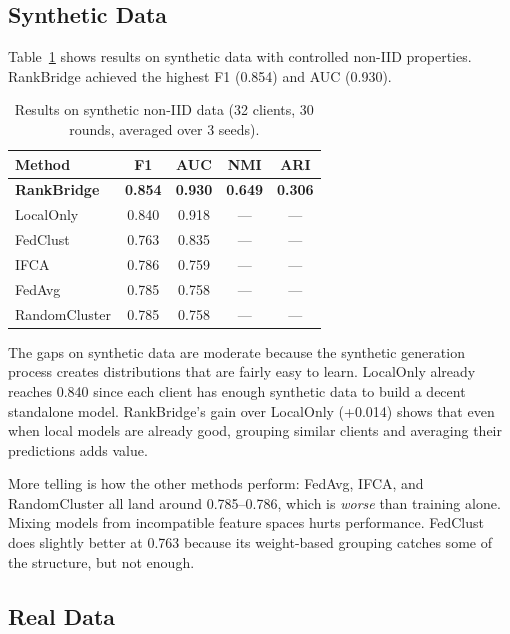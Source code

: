 \documentclass[12pt,a4paper]{article}
\begin{document}
\subsection{Synthetic Data}

Table~\ref{tab:synthetic_results} shows results on synthetic data with controlled non-IID properties. RankBridge achieved the highest F1 (0.854) and AUC (0.930).

\begin{table}[H]
\centering
\caption{Results on synthetic non-IID data (32 clients, 30 rounds, averaged over 3 seeds).}\label{tab:synthetic_results}
\begin{tabular}{lcccc}
\toprule
\textbf{Method} & \textbf{F1} & \textbf{AUC} & \textbf{NMI} & \textbf{ARI} \\
\midrule
\textbf{RankBridge} & \textbf{0.854} & \textbf{0.930} & \textbf{0.649} & \textbf{0.306} \\
LocalOnly           & 0.840 & 0.918 & --- & --- \\
FedClust            & 0.763 & 0.835 & --- & --- \\
IFCA                & 0.786 & 0.759 & --- & --- \\
FedAvg              & 0.785 & 0.758 & --- & --- \\
RandomCluster       & 0.785 & 0.758 & --- & --- \\
\bottomrule
\end{tabular}
\end{table}

The gaps on synthetic data are moderate because the synthetic generation process creates distributions that are fairly easy to learn. LocalOnly already reaches 0.840 since each client has enough synthetic data to build a decent standalone model. RankBridge's gain over LocalOnly (+0.014) shows that even when local models are already good, grouping similar clients and averaging their predictions adds value.

More telling is how the other methods perform: FedAvg, IFCA, and RandomCluster all land around 0.785--0.786, which is \textit{worse} than training alone. Mixing models from incompatible feature spaces hurts performance. FedClust does slightly better at 0.763 because its weight-based grouping catches some of the structure, but not enough.

\subsection{Real Data}
\end{document}
